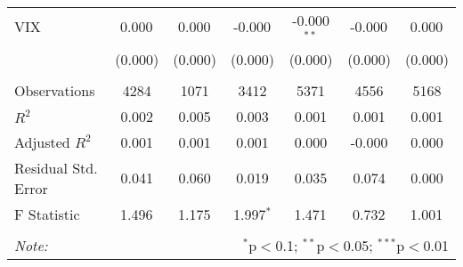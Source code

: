 \begin{table}[!htbp]
\begin{adjustbox}{width=0.75\textwidth}
\begin{tabular}{@{\extracolsep{5pt}}lcccccc}
 VIX & 0.000$^{}$ & 0.000$^{}$ & -0.000$^{}$ & -0.000$^{**}$ & -0.000$^{}$ & 0.000$^{}$ \\
& (0.000) & (0.000) & (0.000) & (0.000) & (0.000) & (0.000) \\
\hline \\[-1.8ex]
 Observations & 4284 & 1071 & 3412 & 5371 & 4556 & 5168 \\
 $R^2$ & 0.002 & 0.005 & 0.003 & 0.001 & 0.001 & 0.001 \\
 Adjusted $R^2$ & 0.001 & 0.001 & 0.001 & 0.000 & -0.000 & 0.000 \\
 Residual Std. Error & 0.041 & 0.060 & 0.019 & 0.035 & 0.074 & 0.000 \\
 F Statistic & 1.496$^{}$ & 1.175$^{}$ & 1.997$^{*}$ & 1.471$^{}$ & 0.732$^{}$ & 1.001$^{}$ \\
\hline
\hline \\[-1.8ex]
\textit{Note:} & \multicolumn{6}{r}{$^{*}$p$<$0.1; $^{**}$p$<$0.05; $^{***}$p$<$0.01} \\
\end{tabular}
\end{adjustbox}
\end{table}